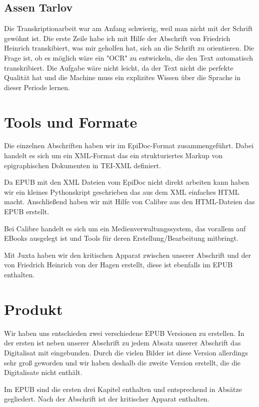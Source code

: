 \documentclass[a4paper, 12pt, oneside]{scrbook}
\begin{document}
\subsection{Assen Tarlov}

Die Transkriptionarbeit war am Anfang schwierig, weil man nicht mit der Schrift gewöhnt ist. Die erste Zeile habe ich mit Hilfe der Abschrift von Friedrich Heinrich transkibiert, was mir geholfen hat, sich an die Schrift zu orientieren. Die Frage ist, ob es möglich wäre ein "OCR" zu entwickeln, die den Text automatisch transkribiert. Die Aufgabe wäre nicht leicht, da der Text nicht die perfekte Qualität hat und die Machine muss ein explizites Wissen über die Sprache in dieser Periode lernen.

\section{Tools und Formate}
Die einzelnen Abschriften haben wir im EpiDoc-Format zusammengeführt. Dabei handelt es sich um ein XML-Format das ein strukturiertes Markup von epigraphischen Dokumenten in TEI-XML definiert.

Da EPUB mit den XML Dateien vom EpiDoc nicht direkt arbeiten kann haben wir ein kleines Pythonskript geschrieben das aus dem XML einfaches HTML macht. Anschließend haben wir mit Hilfe von Calibre aus den HTML-Dateien das EPUB erstellt.

Bei Calibre\cite{calibre} handelt es sich um ein Medienverwaltungssystem, das vorallem auf EBooks ausgelegt ist und Tools für deren Erstellung/Bearbeitung mitbringt.

Mit Juxta\cite{juxta} haben wir den kritischen Apparat zwischen unserer Abschrift und der von  Friedrich Heinrich von der Hagen erstellt, diese ist ebenfalls im EPUB enthalten.

\newpage
\section{Produkt}
Wir haben uns entschieden zwei verschiedene EPUB Versionen zu erstellen. In der ersten ist neben unserer Abschrift zu jedem Absatz unserer Abschrift das Digitalisat mit eingebunden. Durch die vielen Bilder ist diese Version allerdings sehr groß geworden und wir haben deshalb die zweite Version erstellt, die die Digitalisate nicht enthält.

Im EPUB sind die ersten drei Kapitel enthalten und entsprechend in Absätze gegliedert. Nach der Abschrift ist der kritischer Apparat enthalten.
\end{document}
